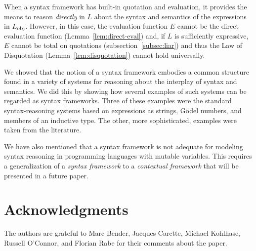 \documentclass[11pt,fleqn]{article}
\newcommand{\bsp}{\begin{sloppypar}}
\newcommand{\esp}{\end{sloppypar}}
\begin{document}
When a syntax framework has built-in quotation and evaluation, it
provides the means to reason \emph{directly} in $L$ about the syntax
and semantics of the expressions in $L_{\rm obj}$.  However, in this
case, the evaluation function $E$ cannot be the direct evaluation
function (Lemma~\ref{lem:direct-eval}) and, if $L$ is sufficiently
expressive, $E$ cannot be total on quotations
(subsection~\ref{subsec:liar}) and thus the Law of Disquotation
(Lemma~\ref{lem:disquotation}) cannot hold universally. 

We showed that the notion of a syntax framework embodies a common
structure found in a variety of systems for reasoning about the
interplay of syntax and semantics.  We did this by showing how several
examples of such systems can be regarded as syntax frameworks.  Three
of these examples were the standard syntax-reasoning systems based on
expressions as strings, G\"odel numbers, and members of an inductive
type.  The other, more sophisticated, examples were taken from
the literature.

We have also mentioned that a syntax framework is not adequate for
modeling syntax reasoning in programming languages with mutable
variables.  This requires a generalization of a \emph{syntax
  framework} to a \emph{contextual framework} that will be presented
in a future paper.

\section*{Acknowledgments}
\bsp
The authors are grateful to Marc Bender, Jacques Carette, Michael
Kohlhase, Russell O'Connor, and Florian Rabe for their comments about
the paper.
\esp  

\iffalse

The authors would also like to thank the referees for their detailed
examination of the paper and valuable suggestions.

\fi

 

\end{document}
